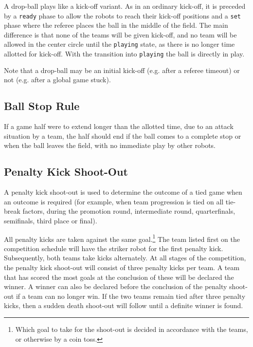 A drop-ball plays like a kick-off variant. As in an ordinary kick-off, it is
preceded by a \texttt{ready} phase to allow the robots to reach their kick-off
positions and a \texttt{set} phase where the referee places the ball in the
middle of the field.
The main difference is that none of the teams will be given kick-off,
and no team will be allowed in the center circle until the \texttt{playing} state,
as there is no longer time allotted for kick-off.
With the transition into \texttt{playing} the ball is directly in play.

Note that a drop-ball may be an initial kick-off (e.g. after a referee timeout)
or not (e.g. after a global game stuck).

\subsection{Ball Stop Rule}
\label{sec:early_stopping}

If a game half were to extend longer than the allotted time, due to an attack situation by a team, the half should end if the ball comes to a complete stop or when the ball leaves the field, with no immediate play by other robots.

\subsection{Penalty Kick Shoot-Out}
\label{sec:penalty_shoot-out}

A penalty kick shoot-out is used to determine the outcome of a tied game when an outcome is required (for example, when team progression is tied on all tie-break factors, during the promotion round, intermediate round, quarterfinals, semifinals, third place or final).

All penalty kicks are taken against the same goal.\footnote{
  Which goal to take for the shoot-out is decided in accordance with the teams, or otherwise by a coin toss.
}
The team listed first on the competition schedule will have the striker robot for the first penalty kick.
Subsequently, both teams take kicks alternately.
At all stages of the competition, the penalty kick shoot-out will consist of three penalty kicks per team.
A team that has scored the most goals at the conclusion of these will be declared the winner.
A winner can also be declared before the conclusion of the penalty shoot-out if a team can no longer win.
If the two teams remain tied after three penalty kicks, then a sudden death shoot-out will follow until a definite winner is found.

